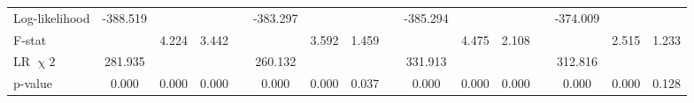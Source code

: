 {\begin{longtable}{@{\extracolsep{\fill}}lccccccccccccccc}
    Log-likelihood & -388.519 &   &   &   & -383.297 &   &   &   & -385.294 &   &   &   & -374.009 &   &  \\
    F-stat &   & 4.224 & 3.442 &   &   & 3.592 & 1.459 &   &   & 4.475 & 2.108 &   &   & 2.515 & 1.233 \\
    LR $\upchi2$ & 281.935 &   &   &   & 260.132 &   &   &   & 331.913 &   &   &   & 312.816 &   &  \\
    p-value & 0.000 & 0.000 & 0.000 &   & 0.000 & 0.000 & 0.037 &   & 0.000 & 0.000 & 0.000 &   & 0.000 & 0.000 & 0.128 \\
    \bottomrule
    \end{longtable}%
}